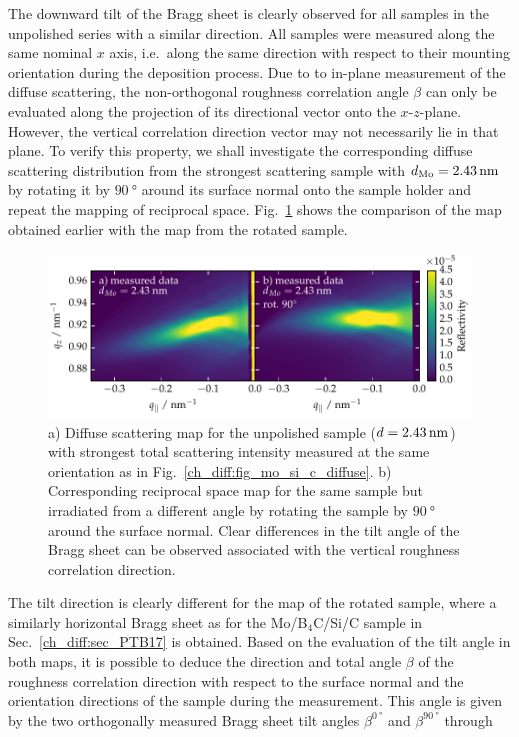 The downward tilt of the Bragg sheet is clearly observed for all samples in the unpolished series with a similar direction. All samples were measured along the same nominal $x$ axis, i.e.~along the same direction with respect to their mounting orientation during the deposition process. Due to to in-plane measurement of the diffuse scattering, the non-orthogonal roughness correlation angle $\beta$ can only be evaluated along the projection of its directional vector onto the $x$-$z$-plane. However, the vertical correlation direction vector may not necessarily lie in that plane. To verify this property, we shall investigate the corresponding diffuse scattering distribution from the strongest scattering sample with $d_\text{Mo} = \nm{2.43}$ by rotating it by $\SI{90}{\degree}$ around its surface normal onto the sample holder and repeat the mapping of reciprocal space. Fig.~\ref{ch_diff:fig_diffuse_tilt_vs_notilt} shows the comparison of the map obtained earlier with the map from the rotated sample.
\begin{figure}[htbp]
\centering
\includegraphics[width=\textwidth]{img/MoSiC_diffuse_tilt_vs_notilt}
\caption{a) Diffuse scattering map for the unpolished sample ($d=\nm{2.43}$) with strongest total scattering intensity measured at the same orientation as in Fig.~\ref{ch_diff:fig_mo_si_c_diffuse}. b) Corresponding reciprocal space map for the same sample but irradiated from a different angle by rotating the sample by $\SI{90}{\degree}$ around the surface normal. Clear differences in the tilt angle of the Bragg sheet can be observed associated with the vertical roughness correlation direction.}
\label{ch_diff:fig_diffuse_tilt_vs_notilt}
\end{figure}
The tilt direction is clearly different for the map of the rotated sample, where a similarly horizontal Bragg sheet as for the Mo/B$_4$C/Si/C sample in Sec.~\ref{ch_diff:sec_PTB17} is obtained. Based on the evaluation of the tilt angle in both maps, it is possible to deduce the direction and total angle $\beta$ of the roughness correlation direction with respect to the surface normal and the orientation directions of the sample during the measurement. This angle is given by the two orthogonally measured Bragg sheet tilt angles $\beta^{\SI{0}{\degree}}$ and $\beta^{\SI{90}{\degree}}$ through
